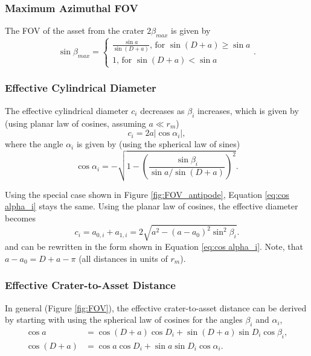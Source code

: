 \documentclass{article}
\begin{document}
\subsubsection{Maximum Azimuthal FOV}
The FOV of the asset from the crater $2\beta_{max}$ is given by
\begin{equation}\label{eq:beta max}
\sin\beta_{max} =\begin{cases}
\frac{\sin a}{\sin(D+a)} \text{, for $\sin(D+a) \ge \sin a$}\\
1 \text{, for $\sin(D+a) < \sin a$}
\end{cases}.
\end{equation}

\subsubsection{Effective Cylindrical Diameter}
The effective cylindrical diameter $c_i$ decreases as $\beta_i$ increases, which is given by (using planar law of cosines, assuming $a \ll r_m$)
\begin{equation}
c_i = 2a|\cos\alpha_i|,
\end{equation}
where the angle $\alpha_i$ is given by (using the spherical law of sines)
\begin{equation}\label{eq:cos alpha_i}
\cos\alpha_i = -\sqrt{1 - \left(\frac{\sin\beta_i}{\sin a / \sin(D+a)}\right)^2}.
\end{equation}

Using the special case shown in Figure \ref{fig:FOV_antipode}, Equation \eqref{eq:cos alpha_i} stays the same. Using the planar law of cosines, the effective diameter becomes
\begin{equation}
c_i = a_{0,i} + a_{1,i} = 2\sqrt{a^2 - (a-a_0)^2\sin^2\beta_i}.
\end{equation}
and can be rewritten in the form shown in Equation \eqref{eq:cos alpha_i}. Note, that $a-a_0 = D + a - \pi$ (all distances in units of $r_m$).

\subsubsection{Effective Crater-to-Asset Distance}
In general (Figure \ref{fig:FOV}), the effective crater-to-asset distance can be derived by starting with using the spherical law of cosines for the angles $\beta_i$ and $\alpha_i$,
\begin{align}
\cos a &= \cos(D+a)\cos D_i + \sin(D+a)\sin D_i\cos\beta_i,\label{eq:Di_der1}\\
\cos(D+a) &= \cos a\cos D_i + \sin a\sin D_i\cos\alpha_i.\label{eq:Di_der2}
\end{align}
\end{document}
